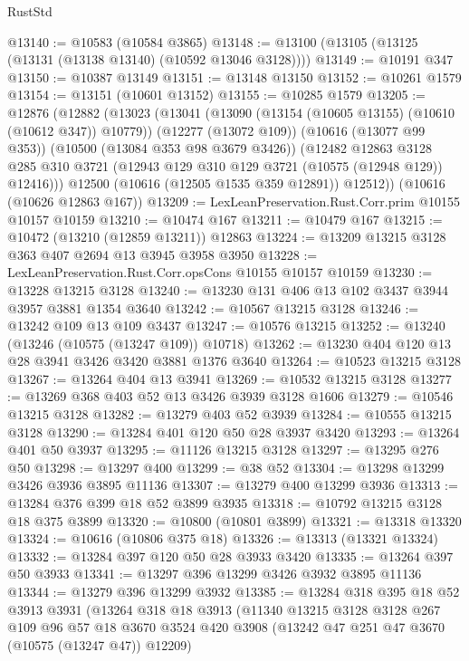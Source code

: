 \begin{lexlean}{RustStd}
\begin{coremodule}
@13140 := @10583 (@10584 @3865)
@13148 := @13100 (@13105 (@13125 (@13131 (@13138 @13140) (@10592 @13046 @3128))))
@13149 := @10191 @347
@13150 := @10387 @13149
@13151 := @13148 @13150
@13152 := @10261 @1579
@13154 := @13151 (@10601 @13152)
@13155 := @10285 @1579
@13205 := @12876
    (@12882
      (@13023
        (@13041
          (@13090 (@13154 (@10605 @13155) (@10610 (@10612 @347)) @10779))
          (@12277 (@13072 @109))
          (@10616 (@13077 @99 @353))
          (@10500 (@13084 @353 @98 @3679 @3426))
          (@12482
            @12863
            @3128
            @285
            @310
            @3721
            (@12943 @129 @310 @129 @3721 (@10575 (@12948 @129)) @12416)))
        @12500
        (@10616 (@12505 @1535 @359 @12891))
        @12512))
    (@10616 (@10626 @12863 @167))
@13209 := LexLeanPreservation.Rust.Corr.prim @10155 @10157 @10159
@13210 := @10474 @167
@13211 := @10479 @167
@13215 := @10472 (@13210 (@12859 @13211)) @12863
@13224 := @13209 @13215 @3128 @363 @407 @2694 @13 @3945 @3958 @3950
@13228 := LexLeanPreservation.Rust.Corr.opsCons @10155 @10157 @10159
@13230 := @13228 @13215 @3128
@13240 := @13230 @131 @406 @13 @102 @3437 @3944 @3957 @3881 @1354 @3640
@13242 := @10567 @13215 @3128
@13246 := @13242 @109 @13 @109 @3437
@13247 := @10576 @13215
@13252 := @13240 (@13246 (@10575 (@13247 @109)) @10718)
@13262 := @13230 @404 @120 @13 @28 @3941 @3426 @3420 @3881 @1376 @3640
@13264 := @10523 @13215 @3128
@13267 := @13264 @404 @13 @3941
@13269 := @10532 @13215 @3128
@13277 := @13269 @368 @403 @52 @13 @3426 @3939 @3128 @1606
@13279 := @10546 @13215 @3128
@13282 := @13279 @403 @52 @3939
@13284 := @10555 @13215 @3128
@13290 := @13284 @401 @120 @50 @28 @3937 @3420
@13293 := @13264 @401 @50 @3937
@13295 := @11126 @13215 @3128
@13297 := @13295 @276 @50
@13298 := @13297 @400
@13299 := @38 @52
@13304 := @13298 @13299 @3426 @3936 @3895 @11136
@13307 := @13279 @400 @13299 @3936
@13313 := @13284 @376 @399 @18 @52 @3899 @3935
@13318 := @10792 @13215 @3128 @18 @375 @3899
@13320 := @10800 (@10801 @3899)
@13321 := @13318 @13320
@13324 := @10616 (@10806 @375 @18)
@13326 := @13313 (@13321 @13324)
@13332 := @13284 @397 @120 @50 @28 @3933 @3420
@13335 := @13264 @397 @50 @3933
@13341 := @13297 @396 @13299 @3426 @3932 @3895 @11136
@13344 := @13279 @396 @13299 @3932
@13385 := @13284
    @318
    @395
    @18
    @52
    @3913
    @3931
    (@13264
      @318
      @18
      @3913
      (@11340
        @13215
        @3128
        @3128
        @267
        @109
        @96
        @57
        @18
        @3670
        @3524
        @420
        @3908
        (@13242 @47 @251 @47 @3670 (@10575 (@13247 @47)) @12209)

\end{coremodule}
\end{lexlean}
